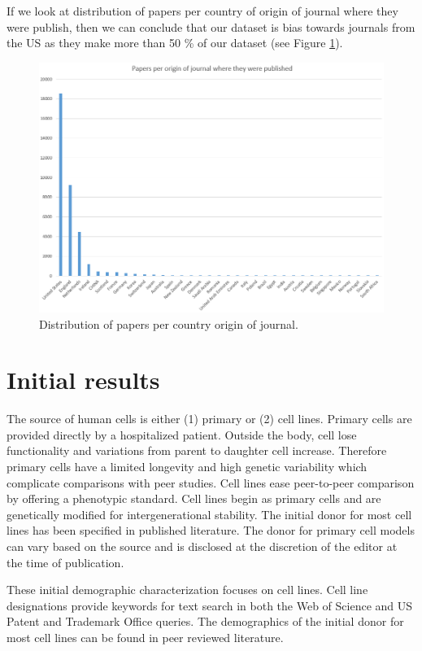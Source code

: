 \documentclass[10pt]{article}
\begin{document}
If we look at distribution of papers per country of origin of journal where they were publish, then we can conclude that our dataset is bias towards journals from the US as they make more than 50 \% of our dataset (see Figure \ref{dist2}).

\begin{figure}[h!]
\centering
\includegraphics[width=0.98\columnwidth]{Figures/Figure2.png}
\caption{\label{dist2}Distribution of papers per country origin of journal.}
\end{figure}

\section{Initial results}
The source of human cells is either (1) primary or (2) cell lines. Primary cells are provided directly by a hospitalized patient. Outside the body, cell lose  functionality and variations from parent to daughter cell increase. Therefore primary cells have a limited longevity and high genetic variability which complicate comparisons with peer studies. Cell lines ease peer-to-peer comparison by offering a phenotypic standard. Cell lines begin as primary cells and are genetically modified for intergenerational stability. The initial donor for most cell lines has been specified in published literature. The donor for primary cell models can vary based on the source and is disclosed at the discretion of the editor at the time of publication. 

These initial demographic characterization focuses on cell lines. Cell line designations provide keywords for text search in both the Web of Science and US Patent and Trademark Office queries. The demographics of the initial donor for most cell lines can be found in peer reviewed literature. 
\end{document}
